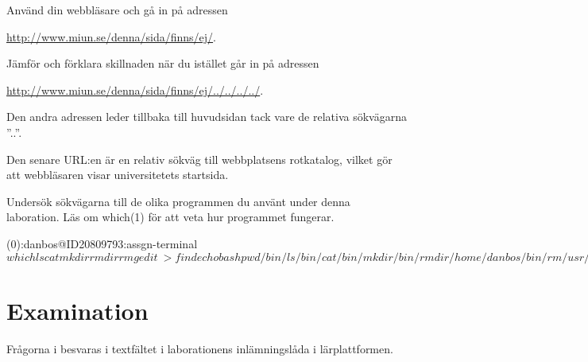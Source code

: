 \documentclass[a4paper]{miunasgn}
\begin{document}
\begin{questions}
	\question\label{q:RelativeWWW}
	Använd din webbläsare och gå in på adressen
	\begin{center}
		\url{http://www.miun.se/denna/sida/finns/ej/}.
	\end{center}
	Jämför och förklara skillnaden när du istället går in på adressen
	\begin{center}
		\url{http://www.miun.se/denna/sida/finns/ej/../../../../}.
	\end{center}
	\begin{solution}
		Den andra adressen leder tillbaka till huvudsidan tack vare de relativa
		sökvägarna ''..''.
	\end{solution}
	\begin{solution}
		Den senare URL:en är en relativ sökväg till webbplatsens rotkatalog, vilket 
		gör att webbläsaren visar universitetets startsida.
	\end{solution}

	\question\label{q:which}
	Undersök sökvägarna till de olika programmen du använt under denna 
	laboration.
	Läs om which(1) för att veta hur programmet fungerar.
	\begin{solution}
		\begin{terminal}
(0):danbos@ID20809793:assgn-terminal$ which ls cat mkdir rmdir rm gedit \
> find echo bash pwd
/bin/ls
/bin/cat
/bin/mkdir
/bin/rmdir
/home/danbos/bin/rm
/usr/bin/gedit
/usr/bin/find
/bin/echo
/bin/bash
/bin/pwd
(0):danbos@ID20809793:assgn-terminal$
		\end{terminal}
	\end{solution}


\end{questions}


\section{Examination}
\label{sec:Examination}
\noindent
Frågorna i  besvaras i textfältet i laborationens 
inlämningslåda i lär\-platt\-formen.


\printbibliography
\end{document}
